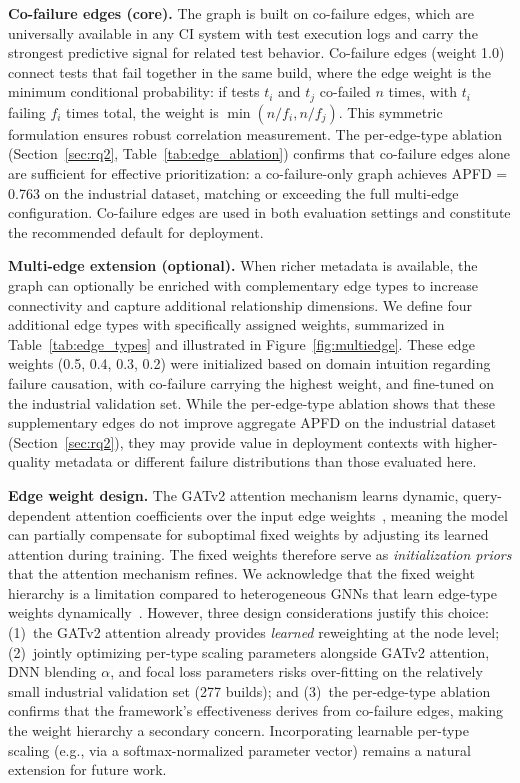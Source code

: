 \documentclass[10pt,journal,compsoc]{IEEEtran}
\begin{document}
\textbf{Co-failure edges (core).} The graph is built on co-failure edges,
which are universally available in any CI system with test execution logs
and carry the strongest predictive signal for related test behavior.
Co-failure edges (weight 1.0) connect tests that fail together in the same
build, where the edge weight is the minimum conditional probability: if
tests $t_i$ and $t_j$ co-failed $n$ times, with $t_i$ failing $f_i$ times
total, the weight is $\min(n/f_i, n/f_j)$. This symmetric formulation
ensures robust correlation measurement. The per-edge-type ablation
(Section~\ref{sec:rq2}, Table~\ref{tab:edge_ablation}) confirms that
co-failure edges alone are sufficient for effective prioritization: a
co-failure-only graph achieves APFD = 0.763 on the industrial dataset,
matching or exceeding the full multi-edge configuration. Co-failure
edges are used in both evaluation settings and constitute the recommended
default for deployment.

\textbf{Multi-edge extension (optional).} When richer metadata is available,
the graph can optionally be enriched with complementary edge types to
increase connectivity and capture additional relationship dimensions. We
define four additional edge types with specifically assigned weights,
summarized in Table~\ref{tab:edge_types} and illustrated in
Figure~\ref{fig:multiedge}. These edge weights (0.5, 0.4, 0.3, 0.2) were
initialized based on domain intuition regarding failure causation, with
co-failure carrying the highest weight, and fine-tuned on the industrial
validation set. While the per-edge-type ablation shows that these
supplementary edges do not improve aggregate APFD on the industrial dataset
(Section~\ref{sec:rq2}), they may provide value in deployment contexts with
higher-quality metadata or different failure distributions than those
evaluated here.

\textbf{Edge weight design.}
The GATv2 attention mechanism learns dynamic, query-dependent attention
coefficients over the input edge weights~\cite{brody2022attentive},
meaning the model can partially compensate for suboptimal fixed weights
by adjusting its learned attention during training. The fixed weights
therefore serve as \emph{initialization priors} that the attention mechanism
refines. We acknowledge that the fixed weight hierarchy is a limitation
compared to heterogeneous GNNs that learn edge-type weights
dynamically~\cite{wu2021comprehensive}. However, three design
considerations justify this choice: (1)~the GATv2 attention already
provides \emph{learned} reweighting at the node level;
(2)~jointly optimizing per-type scaling parameters alongside GATv2
attention, DNN blending $\alpha$, and focal loss parameters risks
over-fitting on the relatively small industrial validation set (277
builds); and (3)~the per-edge-type ablation confirms that the framework's
effectiveness derives from co-failure edges, making the weight hierarchy
a secondary concern. Incorporating learnable per-type scaling (e.g., via
a softmax-normalized parameter vector) remains a natural extension for
future work.
\end{document}
